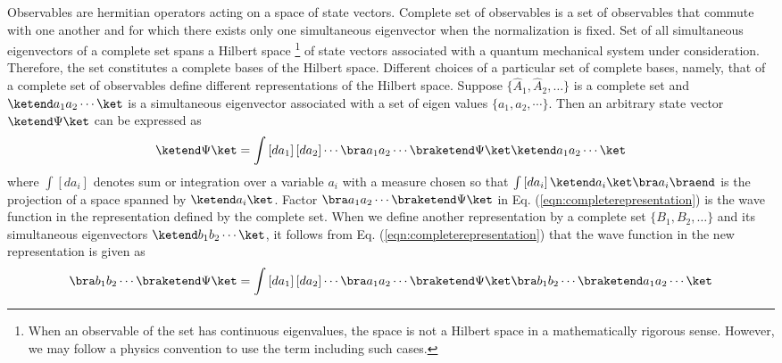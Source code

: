\indent

Observables are hermitian operators acting on a space of state vectors.
Complete set of observables is a set of observables that commute with one another
and for which there exists only one simultaneous eigenvector when the normalization is fixed.
Set of all simultaneous eigenvectors of a complete set spans a Hilbert space
\footnote{%
When an observable of the set has continuous eigenvalues,
the space is not a Hilbert space in a mathematically rigorous sense.
However, we may follow a physics convention to use the term
including such cases.
}%
 of
state vectors associated with a quantum mechanical system under consideration. 
Therefore, the set constitutes a complete bases of the Hilbert space.
Different choices of a particular set of complete bases, namely, that of a complete set of observables
define different representations of the Hilbert space.
Suppose $\{ \hat{A}_1, \hat{A}_2, \dots \}$ is a complete set
and $\ketend  a_1 a_2 \cdots \ket$ is a simultaneous eigenvector
associated with a set of eigen values $\{ a_1, a_2, \cdots \}$.
Then an arbitrary state vector $\ketend \Psi \ket$ can be expressed as
\begin{eqnarray}
\ketend \Psi \ket
=
\int \left[da_1\right] \left[da_2 \right] \cdots
\bra a_1 a_2 \cdots \braketend \Psi \ket
\ketend  a_1 a_2 \cdots \ket
\label{eqn:completerepresentation}
\end{eqnarray}
where $\int \left[ da_i \right]$ denotes sum or integration over a variable $a_i$ with a measure
chosen so that
$\int \left[ da_i \right] \ketend a_i \ket \bra a_i \braend$ is the projection of
a space spanned by $\ketend a_i \ket$.
Factor $\bra a_1 a_2 \cdots \braketend \Psi \ket$ in Eq. (\ref{eqn:completerepresentation}) 
is the wave function in the representation defined by the complete set.
When we define another representation by a complete set $\{ B_1, B_2, \dots \}$ and
its simultaneous eigenvectors $\ketend  b_1 b_2 \cdots \ket$,
it follows from Eq. (\ref{eqn:completerepresentation}) that
the wave function in the new representation is given as
\begin{eqnarray}
\bra b_1 b_2 \cdots \braketend \Psi \ket
= 
\int \left[da_1\right] \left[da_2 \right] \cdots
\bra a_1 a_2 \cdots \braketend \Psi \ket
\bra b_1 b_2 \cdots \braketend  a_1 a_2 \cdots \ket
\label{eqn:changeofrepresentation}
\end{eqnarray}

